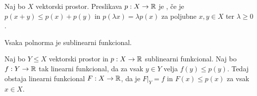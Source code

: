 
\begin{definicija}
  Naj bo $X$ vektorski prostor.
  Preslikava $p: X \to \mathbb{R}$ je , če je $p(x+y) \le
  p(x) + p(y)$ in $p(\lambda x) = \lambda p(x)$ za poljubne $x, y \in X$ ter
  $\lambda \ge 0$.
\end{definicija}


\begin{primer}
  Vsaka polnorma je sublinearni funkcional.
\end{primer}

\begin{izrek}
  Naj bo $Y \le X$ vektorski prostor in $p: X \to \mathbb{R}$ sublinearni funkcional.
  Naj bo $f: Y \to \mathbb{R}$ tak linearni funkcional, da za vsak $y \in Y$ velja $f(y)
  \le p(y)$.
  Tedaj obstaja linearni funkcional $F: X \to \mathbb{R}$, da je $\left. F \right|_Y =
  f$ in $F(x) \le p(x)$ za vsak $x \in X$.
\end{izrek}

